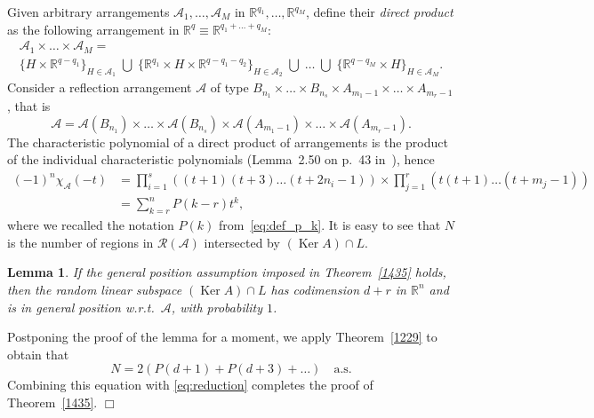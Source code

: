 \documentclass[12pt, reqno]{amsart}
\theoremstyle{plain}
\newtheorem{lemma}[theorem]{Lemma}
\theoremstyle{definition}
\theoremstyle{remark}
\begin{document}
Given arbitrary arrangements ${\mathcal{A}}_1,\ldots,{\mathcal{A}}_M$ in ${\mathbb{R}}^{q_1},\ldots,{\mathbb{R}}^{q_M}$, define their \emph{direct product} as the following arrangement in ${\mathbb{R}}^q \equiv {\mathbb{R}}^{q_1+\ldots+q_M}$:
\begin{multline*}
  {\mathcal{A}}_1\times\ldots\times{\mathcal{A}}_M= \\
  \{ H \times {\mathbb{R}}^{q-q_1} \}_{H \in {\mathcal{A}}_1}\;\bigcup\; \{ {\mathbb{R}}^{q_1} \times H \times {\mathbb{R}}^{q-q_1-q_2}\}_{H \in {\mathcal{A}}_2} \;\bigcup\; \ldots
  \;\bigcup\; \{ {\mathbb{R}}^{q-q_M} \times H\}_{H \in {\mathcal{A}}_M}.
\end{multline*}
Consider a reflection arrangement ${\mathcal{A}}$ of type $B_{n_1} \times \ldots \times B_{n_s}\times A_{m_1-1} \times \ldots \times A_{m_r-1}$, that is
$$
{\mathcal{A}}={\mathcal{A}}(B_{n_1}) \times \ldots \times {\mathcal{A}}(B_{n_s})\times {\mathcal{A}}(A_{m_1-1}) \times \ldots \times {\mathcal{A}}(A_{m_r-1}).
$$
The characteristic polynomial of a direct product of arrangements is the product of the individual characteristic polynomials (Lemma~2.50 on p.~43 in~\cite{OT92}), hence
\begin{align*}
(-1)^{n} \chi_{\mathcal{A}} (-t)
&=\prod_{i=1}^s ((t+1)(t+3)\ldots (t+2n_i-1)) \times\prod_{j=1}^r (t(t+1)\ldots (t+m_j-1)) \\
&=
\sum_{k=r}^{n} P(k-r) t^k,
\end{align*}
where we recalled the notation $P(k)$ from~\eqref{eq:def_p_k}. It is easy to see that $N$ is the number of regions in ${\mathcal{R}}({\mathcal{A}})$ intersected by $(\operatorname*{Ker} A) \cap L$.
\begin{lemma}\label{lem:gen_pos}
If the general position assumption imposed in Theorem~\ref{1435} holds, then the random linear subspace $(\operatorname*{Ker} A)\cap L$ has codimension $d+r$ in ${\mathbb{R}}^n$ and is in general position w.r.t.\ ${\mathcal{A}}$, with probability $1$.
\end{lemma}
Postponing the proof of the lemma for a moment, we apply Theorem~\ref{1229} to obtain that
$$
N = 2 (P(d+1) + P(d+3) +\ldots)
\quad \text{a.s.}
$$
Combining this equation with \eqref{eq:reduction} completes the proof of Theorem~\ref{1435}. \hfill $\Box$
\end{document}
